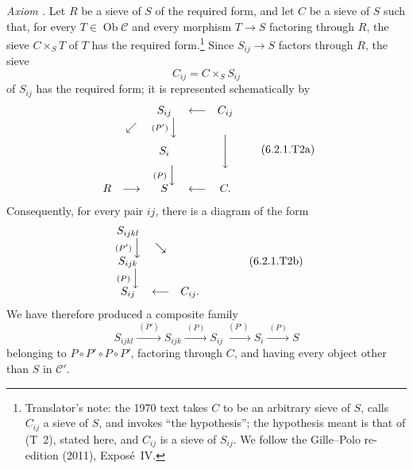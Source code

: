 \smallskip
\noindent\textit{Axiom .}
Let \(R\) be a sieve of \(S\) of the required form, and let \(C\) be a
sieve of
\(S\) such that, for every \(T\in\operatorname{Ob}\mathscr C\) and every
morphism \(T\to S\) factoring through \(R\), the sieve \(C\times_ST\) of
\(T\) has the required form.\footnote{Translator's note: the 1970 text takes \(C\) to be an
arbitrary sieve of \(S\), calls \(C_{ij}\) a sieve of \(S\), and invokes ``the
hypothesis''; the hypothesis meant is that of (T~2), stated here, and
\(C_{ij}\) is a sieve of \(S_{ij}\). We follow the Gille--Polo re-edition
(2011), Expos\'e~IV.} Since \(S_{ij}\to S\) factors through \(R\),
the sieve
\[
  C_{ij}=C\times_SS_{ij}
\]
of \(S_{ij}\) has the required form; it is represented schematically by
\[
\begin{array}{ccccc}
    & & S_{ij} & \longleftarrow & C_{ij}\\
    & \swarrow & \scriptstyle(P')\,\Big\downarrow & &\\[-0.25em]
    & & S_i & & \Bigg\downarrow\\[-0.25em]
    & & \scriptstyle(P)\,\Big\downarrow & &\\[-0.25em]
  R & \longrightarrow & S & \longleftarrow & C .
\end{array}
\tag{6.2.1.T2a}\label{sga3:iv:proposition:6:2:1:eq:6:2:1:t2a:01}
\]
Consequently, for every pair \(ij\), there is a diagram of the form
\[
\begin{array}{ccccc}
  S_{ijkl} & & & &\\
  \scriptstyle(P')\,\Big\downarrow & \searrow & & &\\[-0.25em]
  S_{ijk} & & & &\\
  \scriptstyle(P)\,\Big\downarrow & & & &\\[-0.25em]
  S_{ij} & \longleftarrow & C_{ij}. & &
\end{array}
\tag{6.2.1.T2b}\label{sga3:iv:proposition:6:2:1:eq:6:2:1:t2b:01}
\]
We have therefore produced a composite family
\[
  S_{ijkl}\xrightarrow{\ (P')\ }S_{ijk}
  \xrightarrow{\ (P)\ }S_{ij}
  \xrightarrow{\ (P')\ }S_i
  \xrightarrow{\ (P)\ }S
\tag{6.2.1.T2c}\label{sga3:iv:proposition:6:2:1:eq:6:2:1:t2c:01}
\]
belonging to \(P\circ P'\circ P\circ P'\), factoring through \(C\), and
having every object other than \(S\) in \(\mathscr C'\).

